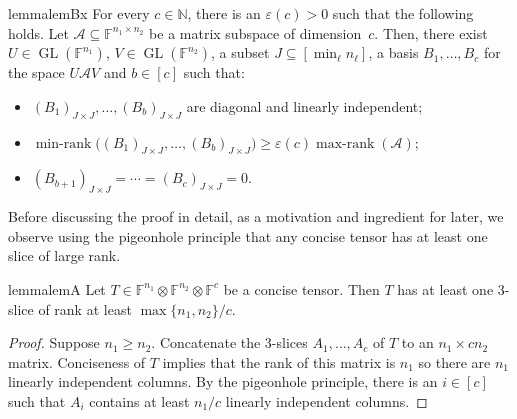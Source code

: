 \documentclass{daj}
\newcommand{\FF}{\mathbb{F}}
\newcommand{\NN}{\mathbb{N}}
\newcommand{\eps}{\varepsilon}
\DeclareMathOperator{\GL}{GL}
\DeclareMathOperator{\maxrank}{max-rank}
\DeclareMathOperator{\minrank}{min-rank}
\DeclareMathOperator{\minrnk}{min-rank}
\begin{document}
\begin{restatable}{lemma}{lemBx}
\label{lem:minrk_diag}
\label{claim:matrices-into-diagonal-with-large-rank}
For every $c\in\NN$, there is an $\eps(c)>0$ such that the following holds.
Let $\mathcal A\subseteq \FF^{n_1\times n_2}$ be a matrix subspace of dimension~$c$.
Then, there exist $U\in \GL(\FF^{n_1})$, $V\in \GL(\FF^{n_2})$, a subset $J\subseteq [\min_\ell n_\ell]$, a basis $B_1,\dots,B_c$ for the space $U\mathcal AV$ and $b\in[c]$ such that:
\begin{itemize}
    \item $(B_1)_{J\times J},\dots,(B_b)_{J\times J}$  are diagonal and linearly independent;
    \item $\minrank\big((B_1)_{J\times J}, \ldots, (B_b)_{J\times J}\big) \geq \eps(c) \maxrank(\mathcal{A})$; %
    \item $(B_{b+1})_{J\times J} = \cdots = (B_c)_{J\times J} = 0$.
\end{itemize}
\end{restatable}


Before discussing the proof in detail, as a motivation and ingredient for later, we observe using the pigeonhole principle that any concise tensor has at least one slice of large rank. 

\begin{restatable}{lemma}{lemA}
%
\label{cla:high-rk}
Let $T\in\FF^{n_1}\otimes\FF^{n_2}\otimes\FF^{c}$ be a concise tensor. Then $T$ has at least one 3-slice 
of rank at least $\max\{n_1,n_2\}/c$.    
%
\end{restatable}

\begin{proof}
Suppose $n_1\geq n_2$. %
Concatenate the 3-slices $A_1, \ldots, A_c$ of $T$ to an $n_1\times cn_2$ matrix. Conciseness of $T$ implies that the rank of this matrix is $n_1$ so there are $n_1$ linearly independent columns. By the pigeonhole principle, there is an $i \in [c]$ such that $A_i$ contains at least $n_1/c$ linearly independent columns.   
\end{proof}



\end{document}
